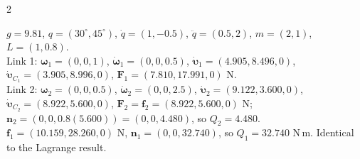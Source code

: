 \begin{multicols}{2}
\begin{deriv}
\end{deriv}
\begin{worked}
$g=9.81$, $q=(30^\circ,45^\circ)$, $\dot q=(1,-0.5)$, $\ddot q=(0.5,2)$, $m=(2,1)$, $L=(1,0.8)$.\\
Link 1: $\boldsymbol\omega_1=(0,0,1)$, $\dot{\boldsymbol\omega}_1=(0,0,0.5)$, $\dot{\boldsymbol\upsilon}_1=(4.905,8.496,0)$, $\dot{\boldsymbol\upsilon}_{C_1}=(3.905,8.996,0)$, $\mathbf F_1=(7.810,17.991,0)$ N.\\
Link 2: $\boldsymbol\omega_2=(0,0,0.5)$, $\dot{\boldsymbol\omega}_2=(0,0,2.5)$, $\dot{\boldsymbol\upsilon}_2=(9.122,3.600,0)$, $\dot{\boldsymbol\upsilon}_{C_2}=(8.922,5.600,0)$, $\mathbf F_2=\mathbf f_2=(8.922,5.600,0)$ N; $\mathbf n_2=(0,0,0.8(5.600))=(0,0,4.480)$, so $Q_2=4.480$.\\
$\mathbf f_1=(10.159,28.260,0)$ N, $\mathbf n_1=(0,0,32.740)$, so $Q_1=32.740$ N\,m. Identical to the Lagrange result. \chk
\end{worked}


\end{multicols}
